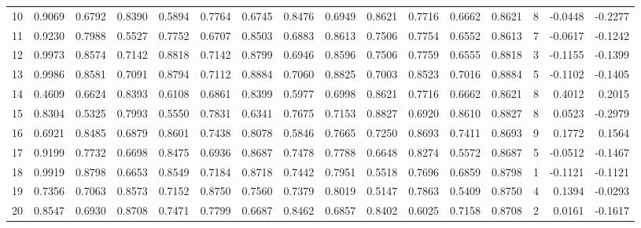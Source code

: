 \begin{tabular}{lrrrrrrrrrrrrrrr}
10  &      0.9069 &  0.6792 &  0.8390 &  0.5894 &  0.7764 &  0.6745 &  0.8476 &  0.6949 &  0.8621 &  0.7716 &   0.6662 &     0.8621 &      8 &                   -0.0448 &                    -0.2277 \\
11  &      0.9230 &  0.7988 &  0.5527 &  0.7752 &  0.6707 &  0.8503 &  0.6883 &  0.8613 &  0.7506 &  0.7754 &   0.6552 &     0.8613 &      7 &                   -0.0617 &                    -0.1242 \\
12  &      0.9973 &  0.8574 &  0.7142 &  0.8818 &  0.7142 &  0.8799 &  0.6946 &  0.8596 &  0.7506 &  0.7759 &   0.6555 &     0.8818 &      3 &                   -0.1155 &                    -0.1399 \\
13  &      0.9986 &  0.8581 &  0.7091 &  0.8794 &  0.7112 &  0.8884 &  0.7060 &  0.8825 &  0.7003 &  0.8523 &   0.7016 &     0.8884 &      5 &                   -0.1102 &                    -0.1405 \\
14  &      0.4609 &  0.6624 &  0.8393 &  0.6108 &  0.6861 &  0.8399 &  0.5977 &  0.6998 &  0.8621 &  0.7716 &   0.6662 &     0.8621 &      8 &                    0.4012 &                     0.2015 \\
15  &      0.8304 &  0.5325 &  0.7993 &  0.5550 &  0.7831 &  0.6341 &  0.7675 &  0.7153 &  0.8827 &  0.6920 &   0.8610 &     0.8827 &      8 &                    0.0523 &                    -0.2979 \\
16  &      0.6921 &  0.8485 &  0.6879 &  0.8601 &  0.7438 &  0.8078 &  0.5846 &  0.7665 &  0.7250 &  0.8693 &   0.7411 &     0.8693 &      9 &                    0.1772 &                     0.1564 \\
17  &      0.9199 &  0.7732 &  0.6698 &  0.8475 &  0.6936 &  0.8687 &  0.7478 &  0.7788 &  0.6648 &  0.8274 &   0.5572 &     0.8687 &      5 &                   -0.0512 &                    -0.1467 \\
18  &      0.9919 &  0.8798 &  0.6653 &  0.8549 &  0.7184 &  0.8718 &  0.7442 &  0.7951 &  0.5518 &  0.7696 &   0.6859 &     0.8798 &      1 &                   -0.1121 &                    -0.1121 \\
19  &      0.7356 &  0.7063 &  0.8573 &  0.7152 &  0.8750 &  0.7560 &  0.7379 &  0.8019 &  0.5147 &  0.7863 &   0.5409 &     0.8750 &      4 &                    0.1394 &                    -0.0293 \\
20  &      0.8547 &  0.6930 &  0.8708 &  0.7471 &  0.7799 &  0.6687 &  0.8462 &  0.6857 &  0.8402 &  0.6025 &   0.7158 &     0.8708 &      2 &                    0.0161 &                    -0.1617 \\

\end{tabular}
